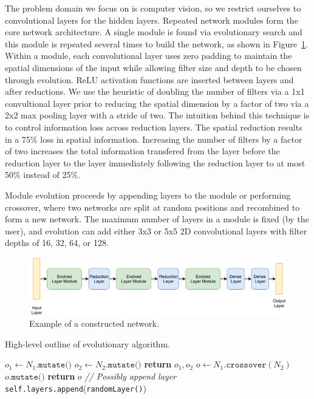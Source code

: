 \documentclass[conference]{IEEEtran}
\begin{document}
The problem domain we focus on is computer vision, so we restrict ourselves
to convolutional layers for the hidden layers. Repeated network modules
form the core network architecture. A single module is found via evolutionary
search and this module is repeated several times to build the network, as
shown in Figure~\ref{fig:sample-arch}.
Within a module, each convolutional layer uses zero padding to maintain the
spatial dimensions of the input while allowing filter size and depth to be
chosen through evolution. ReLU activation functions are inserted between
layers and after reductions.
We use the heuristic of doubling the number of filters
via a 1x1 convultional layer prior to reducing the spatial dimension by a
factor of two via a 2x2 max pooling layer with a stride of two.
The intuition behind this
technique is to control information loss across reduction layers. The spatial
reduction results in a 75\% loss in spatial information. Increasing the
number of filters by a factor of two increases the total information transfered
from the layer before the reduction layer to the layer immediately following
the reduction layer to at most 50\% instead of 25\%.

Module evolution proceeds by appending layers to the module or performing
crossover, where two networks are split at random positions and recombined
to form a new network. The maximum number of layers in a module is fixed
(by the user), and evolution can add either 3x3 or 5x5 2D convolutional
layers with filter depths of 16, 32, 64, or 128.

\begin{figure}
  \centering
  \includegraphics[width=.85\textwidth]{img/sample_arch}
  \caption{Example of a constructed network.}
  \label{fig:sample-arch}
\end{figure}


\begin{algorithm}
  \caption{High-level outline of evolutionary algorithm.}\label{alg:evo-simple}
  \begin{algorithmic}[1]
    \State $o_1\gets N_1.\texttt{mutate()}$
    \State $o_2 \gets N_2.\texttt{mutate()}$
    \State \textbf{return } $o_1, o_2$
    \EndIf
    \State $o \gets N_1.\texttt{crossover}(N_2)$
    \State $o.\texttt{mutate()}$
    \State \textbf{return } $o$
  \EndProcedure
  \State \emph{// Possibly append layer}
  \State \texttt{self.layers.append}(\texttt{randomLayer()})
  \EndIf
  \EndProcedure
  \end{algorithmic}
\end{algorithm}
\end{document}

